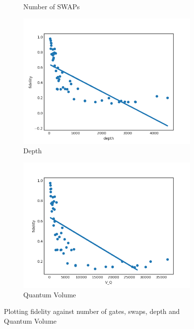 \documentclass[11pt]{article}
\begin{document}
\begin{figure}[H]
\begin{subfigure}[b]{0.5\linewidth}
    \caption{Number of SWAPs} 
    \label{fig:f_s_1000} 
    \vspace{4ex}
  \end{subfigure} 
  \begin{subfigure}[b]{0.5\linewidth}
    \centering
    \includegraphics[width=0.75\linewidth]{f_d_1000_0_005} 
    \caption{Depth} 
    \label{fig:f_d_1000} 
  \end{subfigure}%
  \begin{subfigure}[b]{0.5\linewidth}
    \centering
    \includegraphics[width=0.75\linewidth]{f_q_1000_0_005} 
    \caption{Quantum Volume} 
    \label{fig:f_q_1000} 
  \end{subfigure} 
  \caption{Plotting fidelity against number of gates, swaps, depth and Quantum Volume}
  \label{fig:f_1000} 
\end{figure}
\end{document}
